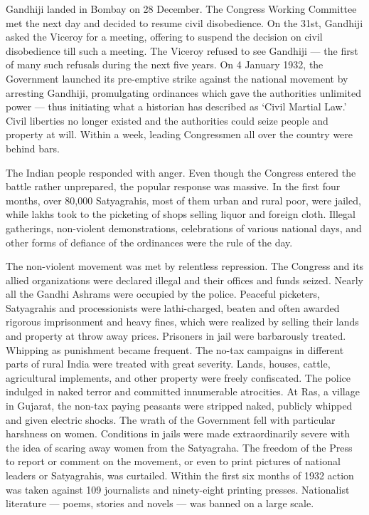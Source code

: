 Gandhiji landed in Bombay on 28 December. The Congress Working Committee met the next day and decided to resume civil disobedience. On the 31st, Gandhiji asked the Viceroy for a meeting, offering to suspend the decision on civil disobedience till such a meeting. The Viceroy refused to see Gandhiji — the first of many such refusals during the next five years. On 4 January 1932, the Government launched its pre-emptive strike against the national movement by arresting Gandhiji, promulgating ordinances which gave the authorities unlimited power — thus initiating what a historian has described as `Civil Martial Law.' Civil liberties no longer existed and the authorities could seize people and property at will. Within a week, leading Congressmen all over the country were behind bars. 

The Indian people responded with anger. Even though the Congress entered the battle rather unprepared, the popular response was massive. In the first four months, over 80,000 Satyagrahis, most of them urban and rural poor, were jailed, while lakhs took to the picketing of shops selling liquor and foreign cloth. Illegal gatherings, non-violent demonstrations, celebrations of various national days, and other forms of defiance of the ordinances were the rule of the day. 

The non-violent movement was met by relentless repression. The Congress and its allied organizations were declared illegal and their offices and funds seized. Nearly all the Gandhi Ashrams were occupied by the police. Peaceful picketers, Satyagrahis and processionists were lathi-charged, beaten and often awarded rigorous imprisonment and heavy fines, which were realized by selling their lands and property at throw away prices. Prisoners in jail were barbarously treated. Whipping as punishment became frequent. The no-tax campaigns in different parts of rural India were treated with great severity. Lands, houses, cattle, agricultural implements, and other property were freely confiscated. The police indulged in naked terror and committed innumerable atrocities. At Ras, a village in Gujarat, the non-tax paying peasants were stripped naked, publicly whipped and given electric shocks. The wrath of the Government fell with particular harshness on women. Conditions in jails were made extraordinarily severe with the idea of scaring away women from the Satyagraha. The freedom of the Press to report or comment on the movement, or even to print pictures of national leaders or Satyagrahis, was curtailed. Within the first six months of 1932 action was taken against 109 journalists and ninety-eight printing presses. Nationalist literature — poems, stories and novels — was banned on a large scale. 

